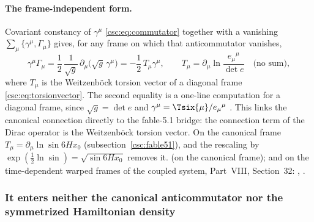 \paragraph{The frame-independent form.} Covariant constancy of $\gamma^\mu$
\eqref{csc:eq:commutator} together with a vanishing $\sum_\mu\{\gamma^\mu,\Gamma_\mu\}$ gives, for
any frame on which that anticommutator vanishes,
\begin{equation}
  \gamma^\mu\Gamma_\mu=\frac12\,\frac{1}{\sqrt g}\,\partial_\mu\bigl(\sqrt g\,\gamma^\mu\bigr)=-\frac12\,T_\mu\gamma^\mu,
  \qquad T_\mu=\partial_\mu\ln\frac{e_\mu{}^\mu}{\det e}\quad\text{(no sum)},
\end{equation}
where $T_\mu$ is the Weitzenb\"ock torsion vector of a diagonal frame \eqref{csc:eq:torsionvector}.
The second equality is a one-line computation for a diagonal frame, since $\sqrt g=\det e$ and
$\gamma^\mu=\Tsix{\mu}/e_\mu{}^\mu$ \cfderived. This links the canonical connection directly to the
fable-5.1 bridge: the connection term of the Dirac operator is the Weitzenb\"ock torsion vector. On
the canonical frame $T_\mu=\partial_\mu\ln\sin 6Hx_0$ (subsection~\ref{csc:fable51}), and the
rescaling by $\exp(\tfrac12\ln\sin)=\sqrt{\sin 6Hx_0}$ removes it. 
 (on the canonical frame); and on the time-dependent warped frames of the coupled system, Part~VIII, Section~32: , .

\subsubsection{It enters neither the canonical anticommutator nor the symmetrized Hamiltonian density}
\label{sec:6.12.4}

